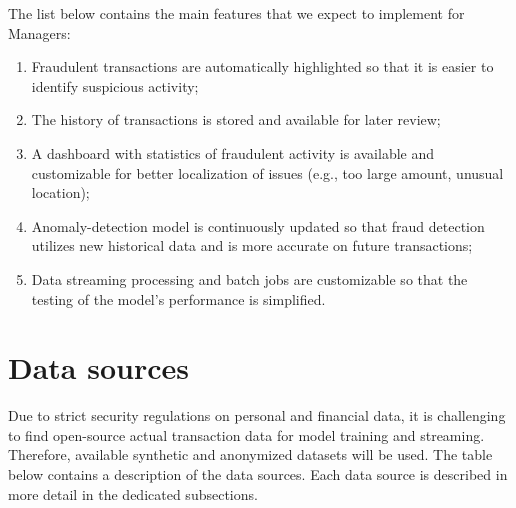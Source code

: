 \documentclass[12pt,a4paper, hidelinks]{article}
\begin{document}
The list below contains the main features that we expect to implement for Managers:
\begin{enumerate}
    \item Fraudulent transactions are automatically highlighted so that it is easier to identify suspicious activity;
    \item The history of transactions is stored and available for later review;
    \item A dashboard with statistics of fraudulent activity is available and customizable for better localization of issues (e.g., too large amount, unusual location);
    \item Anomaly-detection model is continuously updated so that fraud detection utilizes new historical data and is more accurate on future transactions;
    \item Data streaming processing and batch jobs are customizable so that the testing of the model's performance is simplified.
\end{enumerate}


\newpage

\section{Data sources}

Due to strict security regulations on personal and financial data, it is challenging to find open-source actual transaction data for model training and streaming. Therefore, available synthetic and anonymized datasets will be used. The table below contains a description of the data sources. Each data source is described in more detail in the dedicated subsections.
\end{document}
